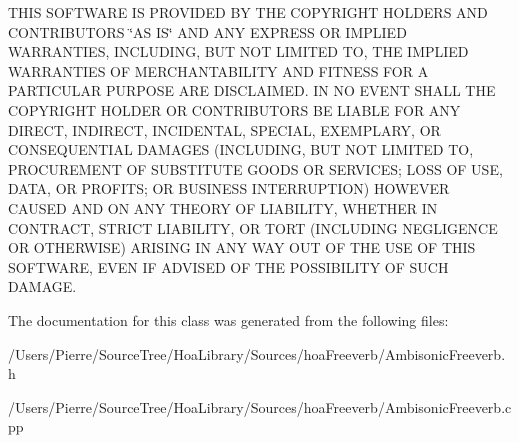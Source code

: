 T\-H\-I\-S S\-O\-F\-T\-W\-A\-R\-E I\-S P\-R\-O\-V\-I\-D\-E\-D B\-Y T\-H\-E C\-O\-P\-Y\-R\-I\-G\-H\-T H\-O\-L\-D\-E\-R\-S A\-N\-D C\-O\-N\-T\-R\-I\-B\-U\-T\-O\-R\-S \char`\"{}\-A\-S I\-S\char`\"{} A\-N\-D A\-N\-Y E\-X\-P\-R\-E\-S\-S O\-R I\-M\-P\-L\-I\-E\-D W\-A\-R\-R\-A\-N\-T\-I\-E\-S, I\-N\-C\-L\-U\-D\-I\-N\-G, B\-U\-T N\-O\-T L\-I\-M\-I\-T\-E\-D T\-O, T\-H\-E I\-M\-P\-L\-I\-E\-D W\-A\-R\-R\-A\-N\-T\-I\-E\-S O\-F M\-E\-R\-C\-H\-A\-N\-T\-A\-B\-I\-L\-I\-T\-Y A\-N\-D F\-I\-T\-N\-E\-S\-S F\-O\-R A P\-A\-R\-T\-I\-C\-U\-L\-A\-R P\-U\-R\-P\-O\-S\-E A\-R\-E D\-I\-S\-C\-L\-A\-I\-M\-E\-D. I\-N N\-O E\-V\-E\-N\-T S\-H\-A\-L\-L T\-H\-E C\-O\-P\-Y\-R\-I\-G\-H\-T H\-O\-L\-D\-E\-R O\-R C\-O\-N\-T\-R\-I\-B\-U\-T\-O\-R\-S B\-E L\-I\-A\-B\-L\-E F\-O\-R A\-N\-Y D\-I\-R\-E\-C\-T, I\-N\-D\-I\-R\-E\-C\-T, I\-N\-C\-I\-D\-E\-N\-T\-A\-L, S\-P\-E\-C\-I\-A\-L, E\-X\-E\-M\-P\-L\-A\-R\-Y, O\-R C\-O\-N\-S\-E\-Q\-U\-E\-N\-T\-I\-A\-L D\-A\-M\-A\-G\-E\-S (I\-N\-C\-L\-U\-D\-I\-N\-G, B\-U\-T N\-O\-T L\-I\-M\-I\-T\-E\-D T\-O, P\-R\-O\-C\-U\-R\-E\-M\-E\-N\-T O\-F S\-U\-B\-S\-T\-I\-T\-U\-T\-E G\-O\-O\-D\-S O\-R S\-E\-R\-V\-I\-C\-E\-S; L\-O\-S\-S O\-F U\-S\-E, D\-A\-T\-A, O\-R P\-R\-O\-F\-I\-T\-S; O\-R B\-U\-S\-I\-N\-E\-S\-S I\-N\-T\-E\-R\-R\-U\-P\-T\-I\-O\-N) H\-O\-W\-E\-V\-E\-R C\-A\-U\-S\-E\-D A\-N\-D O\-N A\-N\-Y T\-H\-E\-O\-R\-Y O\-F L\-I\-A\-B\-I\-L\-I\-T\-Y, W\-H\-E\-T\-H\-E\-R I\-N C\-O\-N\-T\-R\-A\-C\-T, S\-T\-R\-I\-C\-T L\-I\-A\-B\-I\-L\-I\-T\-Y, O\-R T\-O\-R\-T (I\-N\-C\-L\-U\-D\-I\-N\-G N\-E\-G\-L\-I\-G\-E\-N\-C\-E O\-R O\-T\-H\-E\-R\-W\-I\-S\-E) A\-R\-I\-S\-I\-N\-G I\-N A\-N\-Y W\-A\-Y O\-U\-T O\-F T\-H\-E U\-S\-E O\-F T\-H\-I\-S S\-O\-F\-T\-W\-A\-R\-E, E\-V\-E\-N I\-F A\-D\-V\-I\-S\-E\-D O\-F T\-H\-E P\-O\-S\-S\-I\-B\-I\-L\-I\-T\-Y O\-F S\-U\-C\-H D\-A\-M\-A\-G\-E. 

The documentation for this class was generated from the following files\-:\begin{DoxyCompactItemize}
\item 
/\-Users/\-Pierre/\-Source\-Tree/\-Hoa\-Library/\-Sources/hoa\-Freeverb/Ambisonic\-Freeverb.\-h\item 
/\-Users/\-Pierre/\-Source\-Tree/\-Hoa\-Library/\-Sources/hoa\-Freeverb/Ambisonic\-Freeverb.\-cpp\end{DoxyCompactItemize}
